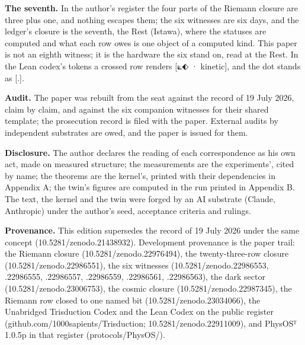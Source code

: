 \documentclass[10pt]{article}
\begin{document}
\textbf{The seventh.} In the author's register the four parts of the
Riemann closure are three plus one, and nothing escapes them; the six
witnesses are six days, and the ledger's closure is the seventh, the
Rest (Istawa), where the statuses are computed and what each row owes is
one object of a computed kind. This paper is not an eighth witness; it
is the hardware the six stand on, read at the Rest. In the Lean codex's
tokens a crossed row renders {[}⟀⬖ · kinetic{]}, and the dot stands as
{[}.{]}.

\textbf{Audit.} The paper was rebuilt from the seat against the record
of 19 July 2026, claim by claim, and against the six companion witnesses
for their shared template; the prosecution record is filed with the
paper. External audits by independent substrates are owed, and the paper
is issued for them.

\textbf{Disclosure.} The author declares the reading of each
correspondence as his own act, made on measured structure; the
measurements are the experiments', cited by name; the theorems are the
kernel's, printed with their dependencies in Appendix A; the twin's
figures are computed in the run printed in Appendix B. The text, the
kernel and the twin were forged by an AI substrate (Claude, Anthropic)
under the author's seed, acceptance criteria and rulings.

\sloppy

\textbf{Provenance.} This edition supersedes the record of 19 July 2026
under the same concept (10.5281/\allowbreak{}zenodo.21438932).
Development provenance is the paper trail: the Riemann closure
(10.5281/\allowbreak{}zenodo.22976494), the twenty-three-row closure
(10.5281/\allowbreak{}zenodo.22986551), the six witnesses
(10.5281/\allowbreak{}zenodo.22986553, .22986555, .22986557, .22986559,
.22986561, .22986563), the dark sector
(10.5281/\allowbreak{}zenodo.23006753), the cosmic closure
(10.5281/\allowbreak{}zenodo.22987345), the Riemann row closed to one
named bit (10.5281/\allowbreak{}zenodo.23034066), the Unabridged
Trisduction Codex and the Lean Codex on the public register
(github.com/\allowbreak{}1000sapients/\allowbreak{}Trisduction;
10.5281/\allowbreak{}zenodo.22911009), and PhysOSᵀ 1.0.5p in that
register (protocols/PhysOS/).
\end{document}
